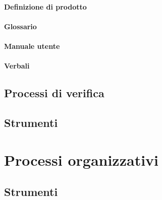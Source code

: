 			\paragraph{Definizione di prodotto}
			\paragraph{Glossario}
			\paragraph{Manuale utente}
			\paragraph{Verbali}
	\subsection{Processi di verifica}
	\subsection{Strumenti}
\section{Processi organizzativi}
	\subsection{Strumenti}

